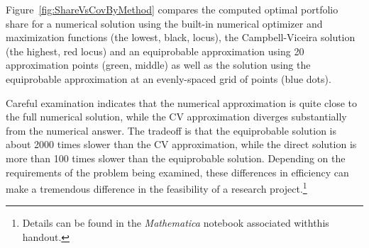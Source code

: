 Figure~\ref{fig:ShareVsCovByMethod} compares the computed optimal portfolio share for a numerical solution
using the built-in numerical optimizer and maximization functions (the lowest, black, locus), the Campbell-Viceira solution (the highest, red locus)
and an equiprobable approximation using 20 approximation points (green, middle) as well as the solution using the equiprobable approximation
at an evenly-spaced grid of points (blue dots).

Careful examination indicates that the numerical approximation is quite close to the full numerical solution, while the CV approximation diverges substantially from the numerical answer.  The tradeoff is that the
equiprobable solution is about 2000 times slower than the CV approximation, while the direct solution is more than 100 times slower
than the equiprobable solution.  Depending on the requirements of the problem being examined, these differences in
efficiency can make a tremendous difference in the feasibility of a research project.\footnote{Details can be found in the {\it Mathematica} notebook associated withthis handout.}

